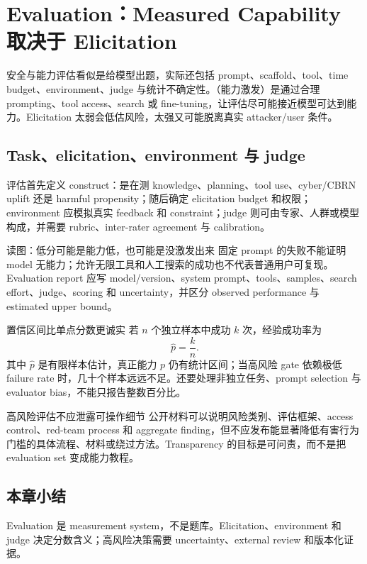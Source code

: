 \section{Evaluation：Measured Capability 取决于 Elicitation}

安全与能力评估看似是给模型出题，实际还包括 prompt、scaffold、tool、time budget、environment、judge 与统计不确定性。（能力激发）是通过合理 prompting、tool access、search 或 fine-tuning，让评估尽可能接近模型可达到能力。Elicitation 太弱会低估风险，太强又可能脱离真实 attacker/user 条件。

\subsection{Task、elicitation、environment 与 judge}

评估首先定义 construct：是在测 knowledge、planning、tool use、cyber/CBRN uplift 还是 harmful propensity；随后确定 elicitation budget 和权限；environment 应模拟真实 feedback 和 constraint；judge 则可由专家、人群或模型构成，并需要 rubric、inter-rater agreement 与 calibration。


\begin{knowledgebox}{读图：低分可能是能力低，也可能是没激发出来}
固定 prompt 的失败不能证明 model 无能力；允许无限工具和人工搜索的成功也不代表普通用户可复现。Evaluation report 应写 model/version、system prompt、tools、samples、search effort、judge、scoring 和 uncertainty，并区分 observed performance 与 estimated upper bound。
\end{knowledgebox}

\begin{importantbox}{置信区间比单点分数更诚实}
若 $n$ 个独立样本中成功 $k$ 次，经验成功率为
\[
\hat p=\frac{k}{n}.
\]
其中 $\hat p$ 是有限样本估计，真正能力 $p$ 仍有统计区间；当高风险 gate 依赖极低 failure rate 时，几十个样本远远不足。还要处理非独立任务、prompt selection 与 evaluator bias，不能只报告整数百分比。
\end{importantbox}

\begin{warningbox}{高风险评估不应泄露可操作细节}
公开材料可以说明风险类别、评估框架、access control、red-team process 和 aggregate finding，但不应发布能显著降低有害行为门槛的具体流程、材料或绕过方法。Transparency 的目标是可问责，而不是把 evaluation set 变成能力教程。
\end{warningbox}

\subsection{本章小结}

Evaluation 是 measurement system，不是题库。Elicitation、environment 和 judge 决定分数含义；高风险决策需要 uncertainty、external review 和版本化证据。

